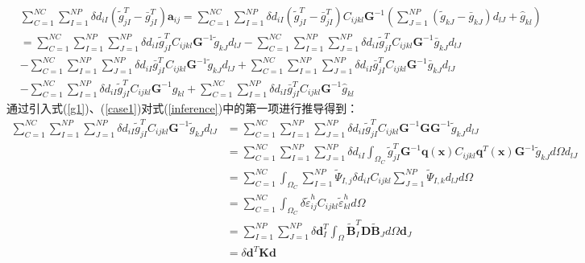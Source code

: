 \begin{equation}\label{inference}
\begin{split}
    &\sum_{C=1}^{N\!C}\sum_{I=1}^{N\!P}\delta d_{iI}(\tilde{g}_{jI}^T-\bar{g}_{jI}^T)\pmb{a}_{ij}=\sum_{C=1}^{N\!C}\sum_{I=1}^{N\!P}\delta d_{iI}(\tilde{g}_{jI}^T-\bar{g}_{jI}^T)C_{ijkl}\pmb{G}^{-1}(\sum_{J=1}^{N\!P}(\tilde{g}_{kJ}-\bar{g}_{kJ})d_{lJ}+\hat{g}_{kl})\\
    &=\sum_{C=1}^{N\!C}\sum_{I=1}^{N\!P}\sum_{J=1}^{N\!P}\delta d_{iI}\tilde{g}^T_{jI}C_{ijkl}\pmb{G}^{-1}\tilde{g}_{kJ}d_{lJ}
    -\sum_{C=1}^{N\!C}\sum_{I=1}^{N\!P}\sum_{J=1}^{N\!P}\delta d_{iI}\tilde{g}^T_{jI}C_{ijkl}\pmb{G}^{-1}\bar{g}_{kJ}d_{lJ}\\
    &-\sum_{C=1}^{N\!C}\sum_{I=1}^{N\!P}\sum_{J=1}^{N\!P}\delta d_{iI}\bar{g}^T_{jI}C_{ijkl}\pmb{G}^{-1}\tilde{g}_{kJ}d_{lJ}
    +\sum_{C=1}^{N\!C}\sum_{I=1}^{N\!P}\sum_{J=1}^{N\!P}\delta d_{iI}\bar{g}^T_{jI}C_{ijkl}\pmb{G}^{-1}\bar{g}_{kJ}d_{lJ}\\
    &-\sum_{C=1}^{N\!C}\sum_{I=1}^{N\!P}\delta d_{iI}\tilde{g}_{jI}^TC_{ijkl}\pmb{G}^{-1}\hat{g}_{kl}
    +\sum_{C=1}^{N\!C}\sum_{I=1}^{N\!P}\delta d_{iI}\bar{g}_{jI}^TC_{ijkl}\pmb{G}^{-1}\hat{g}_{kl}
\end{split}
\end{equation}
通过引入式(\ref{g1})、(\ref{case1})对式(\ref{inference})中的第一项进行推导得到：
\begin{equation}
\begin{split}
    \sum_{C=1}^{N\!C}\sum_{I=1}^{N\!P}\sum_{J=1}^{N\!P}\delta d_{iI}\tilde{g}^T_{jI}C_{ijkl}\pmb{G}^{-1}\tilde{g}_{kJ}d_{lJ}&=\sum_{C=1}^{N\!C}\sum_{I=1}^{N\!P}\sum_{J=1}^{N\!P}\delta d_{iI}\tilde{g}^T_{jI}C_{ijkl}\pmb{G}^{-1}\pmb{G}\pmb{G}^{-1}\tilde{g}_{kJ}d_{lJ}\\
&=\sum_{C=1}^{N\!C}\sum_{I=1}^{N\!P}\sum_{J=1}^{N\!P}\delta d_{iI}\int_{\Omega_C}\tilde{g}_{jI}^T\pmb{G}^{-1}\pmb{q}(\pmb{x})C_{ijkl}\pmb{q}^T(\pmb{x})\pmb{G}^{-1}\tilde{g}_{kJ}d\Omega d_{lJ}\\
&=\sum_{C=1}^{N\!C}\int_{\Omega_C}\sum_{I=1}^{N\!P}\tilde{\Psi}_{I,j}\delta d_{iI}C_{ijkl}\sum_{J=1}^{N\!P}\tilde{\Psi}_{I,k}d_{lJ}d\Omega\\
&=\sum_{C=1}^{N\!C}\int_{\Omega_C}\delta\tilde{\varepsilon}_{ij}^hC_{ijkl}\tilde{\varepsilon}_{kl}^hd\Omega\\
&=\sum_{I=1}^{N\!P}\sum_{J=1}^{N\!P}\delta\pmb{d}^T_I\int_{\Omega}\tilde{\pmb{B}}_I^T\pmb{D}\tilde{\pmb{B}}_Jd\Omega\pmb{d}_J\\
&=\delta\pmb{d}^T\pmb{K}\pmb{d}
\end{split}
\end{equation}
